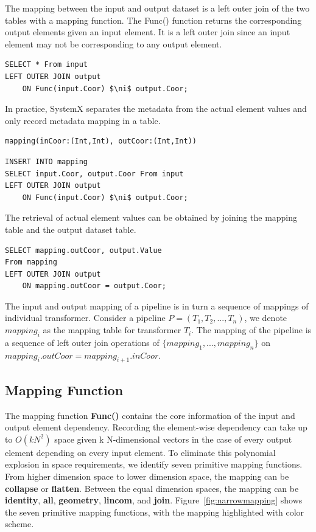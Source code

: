 \documentclass{sig-alternate}
\begin{document}
The mapping between the input and output dataset is a left outer join of the two tables with a mapping function.
The Func() function returns the corresponding output elements given an input element. 
It is a left outer join since an input element may not be corresponding to any output element.
\begin{lstlisting}
SELECT * From input
LEFT OUTER JOIN output 
    ON Func(input.Coor) $\ni$ output.Coor;
\end{lstlisting}

In practice, SystemX separates the metadata from the actual element values and only record metadata mapping
in a table.
\begin{lstlisting}
mapping(inCoor:(Int,Int), outCoor:(Int,Int))
\end{lstlisting}

\begin{lstlisting}
INSERT INTO mapping
SELECT input.Coor, output.Coor From input
LEFT OUTER JOIN output 
    ON Func(input.Coor) $\ni$ output.Coor;
\end{lstlisting}

The retrieval of actual element values can be obtained by joining the mapping table and the output dataset table.
\begin{lstlisting}
SELECT mapping.outCoor, output.Value
From mapping
LEFT OUTER JOIN output 
    ON mapping.outCoor = output.Coor;
\end{lstlisting}

The input and output mapping of a pipeline is in turn a sequence of mappings of individual transformer.
Consider a pipeline $P=(T_1, T_2, ..., T_n)$, we denote $mapping_i$ as the mapping table for transformer $T_i$.
The mapping of the pipeline is a sequence of left outer join operations of $\{mapping_1, ..., mapping_n\}$ 
on $mapping_i.outCoor = mapping_{i+1}.inCoor$.

\subsection{Mapping Function}
\label{sec:Map-Func}
The mapping function {\bf Func()} contains the core information of the input and output element dependency.
Recording the element-wise dependency can take up to $O(kN^2)$ space given k N-dimensional vectors in the case
of every output element depending on every input element. 
To eliminate this polynomial explosion in space requirements, we identify seven primitive mapping functions.
From higher dimension space to lower dimension space, the mapping can be {\bf collapse} or {\bf flatten}.
Between the equal dimension spaces, the mapping can be {\bf identity}, {\bf all}, {\bf geometry}, {\bf lincom}, and {\bf join}.
Figure~\ref{fig:narrowmapping} shows the seven primitive mapping functions, with the mapping highlighted with color scheme.
\end{document}
